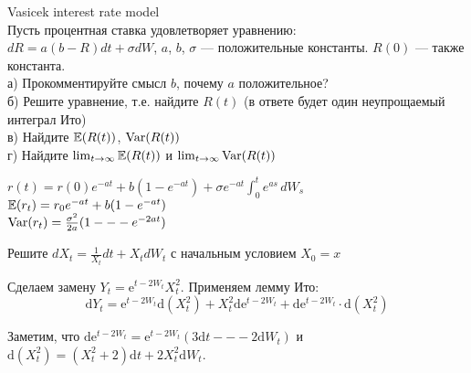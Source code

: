 \begin{solution}
\begin{solution}
\begin{solution}
\begin{solution}
\begin{solution}
\begin{solution}
\begin{solution}
\begin{solution}
\begin{solution}
\begin{solution}
\begin{solution}
\begin{problem}
\end{problem} 
\begin{solution} 

\end{solution}

\begin{problem}
 Vasicek interest rate model \\
Пусть процентная ставка удовлетворяет уравнению: \\
$dR=a(b-R)dt+\sigma dW$, $a$, $b$, $\sigma$ --- положительные константы. $R(0)$ --- также константа. \\
а) Прокомментируйте смысл $b$, почему $a$ положительное? \\
б) Решите уравнение, т.е. найдите $R(t)$ (в ответе будет один неупрощаемый интеграл Ито) \\
в) Найдите $\mathbb{E}(R(t))$, $\operatorname{Var}(R(t))$ \\
г) Найдите $\lim_{t\rightarrow\infty}\mathbb{E}(R(t))$ и $\lim_{t\rightarrow\infty}\operatorname{Var}(R(t))$ 
\end{problem} 
\begin{solution} 


$ r(t) = r(0) e^{-a t} +  b \left(1- e^{-a t}\right) + \sigma e^{-a t}\int_0^t e^{a s}\,dW_s$ \\
$\mathbb{E}(r_t)=r_{0}e^{-at}+b(1-e^{-at})$ \\
$\operatorname{Var}(r_t) = \frac{\sigma^2}{2 a}(1 --- e^{-2at})$ 
\end{solution}

\begin{problem}
Решите $dX_t=\frac{1}{X_t}dt+X_tdW_t$ с начальным условием  $X_0=x$
\end{problem} 
\begin{solution} 
Сделаем замену $Y_t = \mathrm{e}^{t- 2 W_t} X_t^2$. Применяем лемму Ито:
\begin{equation}
  \mathrm{d} Y_t = \mathrm{e}^{t- 2 W_t} \mathrm{d} (X_t^2) + X_t^2 \mathrm{d} \mathrm{e}^{t- 2 W_t} + \mathrm{d} \mathrm{e}^{t- 2 W_t} \cdot \mathrm{d} (X_t^2) 
\end{equation}

Заметим, что $\mathrm{d} \mathrm{e}^{t- 2 W_t} = \mathrm{e}^{t- 2 W_t} \left( 3 \mathrm{d} t --- 2 \mathrm{d} W_t \right)$ и $\mathrm{d}(X_t^2) = (X_t^2 + 2) \mathrm{d} t + 2 X_t^2 \mathrm{d} W_t$.


\end{solution}
\end{solution}
\end{solution}
\end{solution}
\end{solution}
\end{solution}
\end{solution}
\end{solution}
\end{solution}
\end{solution}
\end{solution}
\end{solution}
